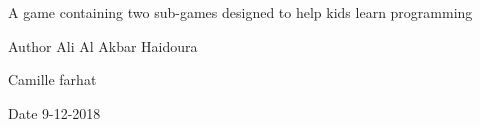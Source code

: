 A game containing two sub-\/games designed to help kids learn programming \begin{DoxyAuthor}{Author}
Ali Al Akbar Haidoura 

Camille farhat 
\end{DoxyAuthor}
\begin{DoxyDate}{Date}
9-\/12-\/2018 
\end{DoxyDate}

